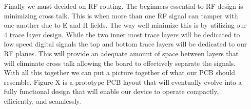 Finally we must decided on RF routing. The beginners essential to RF design is minimizing cross talk. This is when more than one RF signal can tamper with one another due to E and H fields. The way well minimize this is by utilizing our 4 trace layer design. While the two inner most trace layers will be dedicated to low speed digital signals the top and bottom trace layers will be dedicated to our RF planes. This will provide an adequate amount of space between layers that will eliminate cross talk allowing the board to effectively separate the signals. With all this together we can put a picture together of what our PCB should resemble. Figure X is a prototype PCB layout that will eventually evolve into a fully functional design that will enable our device to operate compactly, efficiently, and seamlessly.


